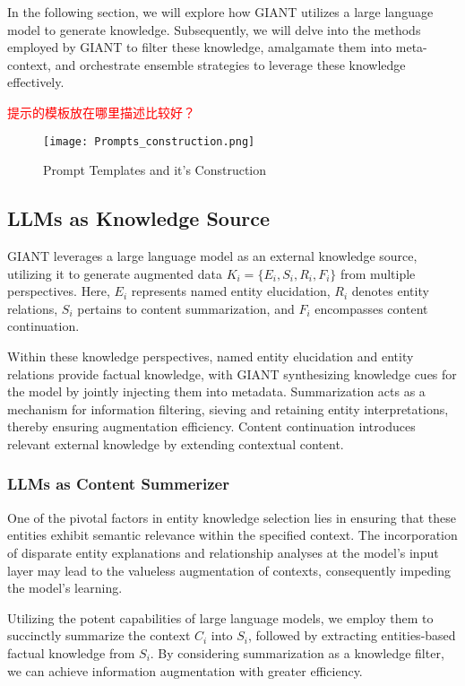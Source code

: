  In the following section, we will explore how GIANT utilizes a large language model to generate knowledge. Subsequently, we will delve into the methods employed by GIANT to filter these knowledge, amalgamate them into meta-context, and orchestrate ensemble strategies to leverage these knowledge effectively.

\textcolor{red}{提示的模板放在哪里描述比较好？}
\label{sec:prompt_construction}
\begin{figure*}[h]
	\centering
	\texttt{[image: Prompts\_construction.png]}
	\caption{Prompt Templates and it's Construction}
	\label{fig:prompt_template}
\end{figure*}   

\subsection{LLMs as Knowledge Source}
 GIANT leverages a large language model as an external knowledge source, utilizing it to generate augmented data $K_i = \{E_i, S_i, R_i, F_i\}$ from multiple perspectives. Here, $E_i$ represents named entity elucidation, $R_i$ denotes entity relations, $S_i$ pertains to content summarization, and $F_i$ encompasses content continuation.

 Within these knowledge perspectives, named entity elucidation and entity relations provide factual knowledge, with GIANT synthesizing knowledge cues for the model by jointly injecting them into metadata.
 Summarization acts as a mechanism for information filtering, sieving and retaining entity interpretations, thereby ensuring augmentation efficiency. 
 Content continuation introduces relevant external knowledge by extending contextual content.
 
\subsubsection{LLMs as Content Summerizer}
 One of the pivotal factors in entity knowledge selection lies in ensuring that these entities exhibit semantic relevance within the specified context. The incorporation of disparate entity explanations and relationship analyses at the model's input layer may lead to the valueless augmentation of contexts, consequently impeding the model's learning.
 
 Utilizing the potent capabilities of large language models, we employ them to succinctly summarize the context $C_i$ into $S_i$, followed by extracting entities-based factual knowledge from $S_i$.
 By considering summarization as a knowledge filter, we can achieve information augmentation with greater efficiency.
 
